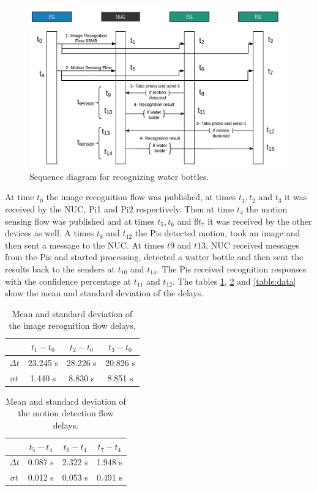 \begin{figure}[H]
	\centering
	\includegraphics[scale=0.45]{images/sequence-diagram.png}
	\caption{Sequence diagram for recognizing water bottles.}
	\label{fig:sd-tensor}
\end{figure} 
 


\noindent At time $t_0$ the image recognition flow was published, at times $t_1, t_2$ and   $t_3$ it was received by the NUC, Pi1 and Pi2 respectively. Then at time $t_4$ the motion sensing flow was published and at times $t_5,t_6$ and $ßt_7$ it was received by the other devices as well. A times $t_8$ and $t_{12}$  the Pis detected motion, took an image and then sent a message to the NUC. At times $t9$ and $t{13}$,  NUC received messages from the Pis and started processing, detected a watter bottle and then sent the  results back to the senders at $t_{10}$ and $t_{14}$. The Pis received recognition responses with the confidence percentage at $t_{11}$ and $t_{12}$.  The tables \ref{table:tensor}, \ref{table:motion} and \ref{table:data} show the mean and standard deviation of the delays.  
\begin{table}[H]
\centering
\begin{tabular}{*{4}{c}}\toprule
&$t_1 - t_0$  & $t_2 - t_0$  & $t_3-t_0$ \\ \midrule
$\Delta t$&	23.245 s&28.226 s&20.826 s\\ 
$\sigma	t$ &1.440 s&8.830 s&8.851 s\\
\end{tabular}
\caption{Mean and standard deviation of the image recognition flow delays.}
\label{table:tensor}
\end{table}


\begin{table}[H]
\centering
\begin{tabular}{*{4}{c}}\toprule
&$t_5 - t_4$  & $t_6 - t_4$  & $t_7-t_4$ \\ \midrule
$\Delta t$ &0.087 s&2.322 s&1.948 s\\
$\sigma t$&0.012 s&0.053 s&0.491 s\\
\end{tabular}
\caption{Mean and standard deviation of the motion detection flow delays.}
\label{table:motion}
\end{table}

